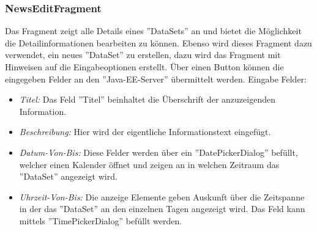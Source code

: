 \subsubsection{NewsEditFragment}
Das Fragment zeigt alle Details eines ''DataSets'' an und bietet die Möglichkeit die Detailinformationen bearbeiten zu können. Ebenso wird dieses Fragment dazu verwendet, ein neues ''DataSet'' zu erstellen, dazu wird das Fragment mit Hinweisen auf die Eingabeoptionen erstellt. Über einen Button können die eingegeben Felder an den ''Java-EE-Server'' übermittelt werden. Eingabe Felder:
\begin{itemize}
	\item {\em Titel:} Das Feld ''Titel'' beinhaltet die Überschrift der anzuzeigenden Information.
	\item {\em Beschreibung:} Hier wird der eigentliche Informationstext eingefügt.
	\item{\em Datum-Von-Bis:} Diese Felder werden über ein ''DatePickerDialog'' befüllt, welcher einen Kalender öffnet und zeigen an in welchen Zeitraum das ''DataSet'' angezeigt wird. 
	\item {\em Uhrzeit-Von-Bis:} Die anzeige Elemente geben Auskunft über die Zeitspanne in der das ''DataSet'' an den einzelnen Tagen angezeigt wird. Das Feld kann mittels ''TimePickerDialog'' befüllt werden.		
\end{itemize}
